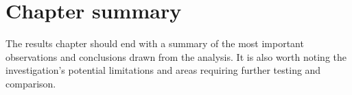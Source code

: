 \section{Chapter summary}
The results chapter should end with a summary of the most important observations and conclusions drawn from the analysis. It is also worth noting the investigation's potential limitations and areas requiring further testing and comparison.
